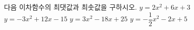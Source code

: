 다음 이차함수의 최댓값과 최솟값을 구하시오.
 $y=2x^2+6x+3$
 $y=-3x^2+12x-15$
 $y=3x^2-18x+25$
 $y=-\dfrac{1}{2}x^2-2x+5$
